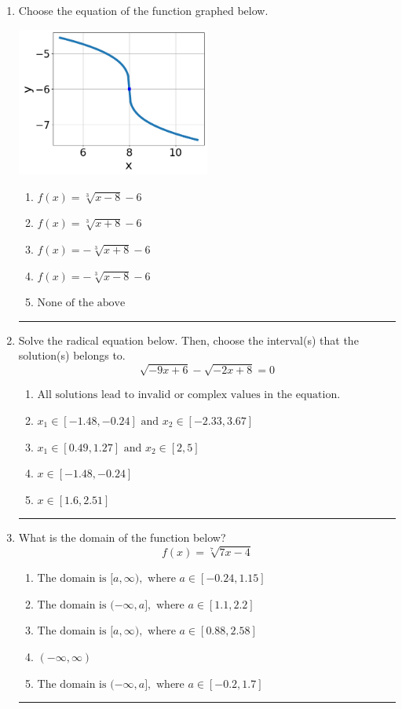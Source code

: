 \documentclass[14pt]{extbook}
\newcommand{\litem}[1]{\item#1\hspace*{-1cm}\rule{\textwidth}{0.4pt}}
\begin{document}
\begin{enumerate}
{\begin{enumerate}[label=\Alph*.]
\end{enumerate} }
\litem{
Choose the equation of the function graphed below.
\begin{center}
    \includegraphics[width=0.5\textwidth]{../Figures/radicalGraphToEquationCopyB.png}
\end{center}
\begin{enumerate}[label=\Alph*.]
\item \( f(x) = \sqrt[3]{x - 8} - 6 \)
\item \( f(x) = \sqrt[3]{x + 8} - 6 \)
\item \( f(x) = - \sqrt[3]{x + 8} - 6 \)
\item \( f(x) = - \sqrt[3]{x - 8} - 6 \)
\item \( \text{None of the above} \)

\end{enumerate} }
\litem{
Solve the radical equation below. Then, choose the interval(s) that the solution(s) belongs to.\[ \sqrt{-9 x + 6} - \sqrt{-2 x + 8} = 0 \]\begin{enumerate}[label=\Alph*.]
\item \( \text{All solutions lead to invalid or complex values in the equation.} \)
\item \( x_1 \in [-1.48, -0.24] \text{ and } x_2 \in [-2.33,3.67] \)
\item \( x_1 \in [0.49, 1.27] \text{ and } x_2 \in [2,5] \)
\item \( x \in [-1.48,-0.24] \)
\item \( x \in [1.6,2.51] \)

\end{enumerate} }
\litem{
What is the domain of the function below?\[ f(x) = \sqrt[7]{7 x - 4} \]\begin{enumerate}[label=\Alph*.]
\item \( \text{The domain is } [a, \infty), \text{   where } a \in [-0.24, 1.15] \)
\item \( \text{The domain is } (-\infty, a], \text{   where } a \in [1.1, 2.2] \)
\item \( \text{The domain is } [a, \infty), \text{   where } a \in [0.88, 2.58] \)
\item \( (-\infty, \infty) \)
\item \( \text{The domain is } (-\infty, a], \text{   where } a \in [-0.2, 1.7] \)


\end{enumerate}}
\end{enumerate}
\end{document}
